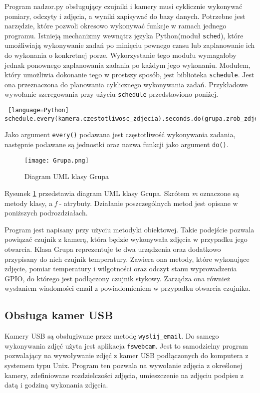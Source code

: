 \documentclass[a4paper,12pt,twoside]{article}
\begin{document}
Program nadzor.py obsługujący czujniki i kamery musi cyklicznie wykonywać pomiary, odczyty i zdjęcia, a wyniki zapisywać do bazy danych. Potrzebne jest narzędzie, które pozwoli okresowo wykonywać funkcje w ramach jednego programu. Istnieją mechanizmy wewnątrz języka Python(moduł \texttt{sched}), które umożliwiają wykonywanie zadań po minięciu pewnego czasu lub zaplanowanie ich do wykonania o konkretnej porze. Wykorzystanie tego modułu wymagałoby jednak ponownego zaplanowania zadania po każdym jego wykonaniu. Modułem, który umożliwia dokonanie tego w prostszy sposób, jest biblioteka \texttt{schedule}. Jest ona przeznaczona do planowania cyklicznego wykonywania zadań. Przykładowe wywołanie szeregowania przy użyciu \texttt{schedule} przedstawiono poniżej.
\begin{lstlisting} [language=Python]
schedule.every(kamera.czestotliwosc_zdjecia).seconds.do(grupa.zrob_zdjecie)
\end{lstlisting}
Jako argument \texttt{every()} podawana jest częstotliwość wykonywania zadania, następnie podawane są jednostki oraz nazwa funkcji jako argument \texttt{do()}.

\begin{figure}[H]
\begin{center}
\texttt{[image: Grupa.png]}
\caption{Diagram UML klasy Grupa}
\label{fig: Grupa}
\end{center}
\end{figure}

Rysunek \ref{fig: Grupa} przedstawia diagram UML klasy Grupa. Skrótem \textit{m} oznaczone są metody klasy, a \textit{f} - atrybuty. Działanie poszczególnych metod jest opisane w poniższych podrozdziałach. 

Program jest napisany przy użyciu metodyki obiektowej. Takie podejście pozwala powiązać czujnik z kamerą, która będzie wykonywała zdjęcia w przypadku jego otwarcia. Klasa Grupa reprezentuje te dwa urządzenia oraz dodatkowo przypisany do nich czujnik temperatury. Zawiera ona metody, które wykonujące zdjęcie, pomiar temperatury i wilgotności oraz odczyt stanu wyprowadzenia GPIO, do którego jest podłączony czujnik stykowy. Zarządza ona również wysłaniem wiadomości email z powiadomieniem w przypadku otwarcia czujnika.

\subsection{Obsługa kamer USB}
Kamery USB są obsługiwane przez metodę \texttt{wyslij{\_}email}. Do samego wykonywania zdjęć użyta jest aplikacja \texttt{fswebcam}. Jest to samodzielny program pozwalający na wywoływanie zdjęć z kamer USB podłączonych do komputera z systemem typu Unix. Program ten pozwala na wywołanie zdjęcia z określonej kamery, zdefiniowane rozdzielczości zdjęcia, umieszczenie na zdjęciu podpisu z datą i godziną wykonania zdjęcia. 
\end{document}
